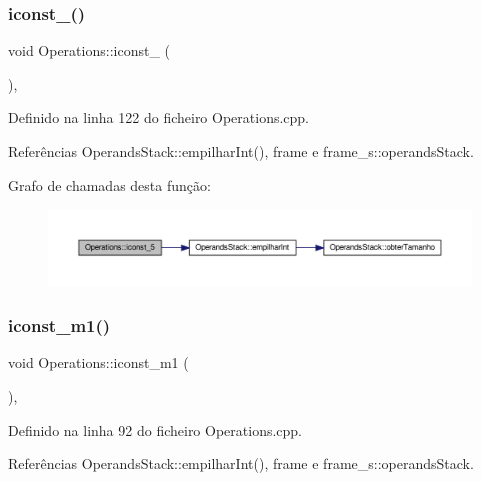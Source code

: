 \subsubsection{\texorpdfstring{iconst\+\_()}{iconst\_5()}}
{\footnotesize\ttfamily void Operations\+::iconst\+\_ (\begin{DoxyParamCaption}{ }\end{DoxyParamCaption})\hspace{0.3cm}{\ttfamily [static]}, {\ttfamily [private]}}



Definido na linha 122 do ficheiro Operations.\+cpp.



Referências Operands\+Stack\+::empilhar\+Int(), frame e frame\+\_\+s\+::operands\+Stack.

Grafo de chamadas desta função\+:\nopagebreak
\begin{figure}[H]
\begin{center}
\leavevmode
\includegraphics[width=350pt]{classOperations_a87a4c7214825d084ded4a8ea50e4af7c_cgraph}
\end{center}
\end{figure}
\mbox{\label{classOperations_abb57552d42047d4b685b2d68db6b1fd7}} 
\subsubsection{\texorpdfstring{iconst\+\_\+m1()}{iconst\_m1()}}
{\footnotesize\ttfamily void Operations\+::iconst\+\_\+m1 (\begin{DoxyParamCaption}{ }\end{DoxyParamCaption})\hspace{0.3cm}{\ttfamily [static]}, {\ttfamily [private]}}



Definido na linha 92 do ficheiro Operations.\+cpp.



Referências Operands\+Stack\+::empilhar\+Int(), frame e frame\+\_\+s\+::operands\+Stack.

